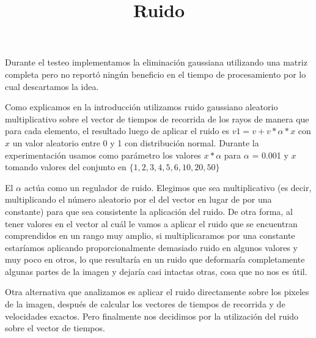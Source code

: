 \par Durante el testeo implementamos la eliminación gaussiana utilizando una matriz completa pero no reportó ningún beneficio en el tiempo de procesamiento por lo cual descartamos la idea.

\title{Ruido} Como explicamos en la introducción utilizamos ruido gaussiano aleatorio multiplicativo sobre el vector de tiempos de recorrida de los rayos de manera que para cada elemento, el resultado luego de aplicar el ruido es $v{1}= v + v * \alpha * x$ con $x$ un valor aleatorio entre 0 y 1 con distribución normal.
Durante la experimentación usamos como parámetro los valores
$x * \alpha$ para $\alpha$ = 0.001 y $x$ tomando valores del conjunto en $\{1,2,3,4,5,6,10,20,50\}$
\par El $\alpha$ actúa como un regulador de ruido. Elegimos que sea multiplicativo (es decir, multiplicando el número aleatorio por el del vector en lugar de por una constante) para que sea consistente la aplicación del ruido. De otra forma, al tener valores en el vector al cuál le vamos a aplicar el ruido que se encuentran comprendidos en un rango muy amplio, si multiplicaramos por una constante estaríamos aplicando proporcionalmente demasiado ruido en algunos valores y muy poco en otros, lo que resultaría en un ruido que deformaría completamente algunas partes de la imagen y dejaría casi intactas otras, cosa que no nos es útil.

\par Otra alternativa que analizamos es aplicar el ruido directamente sobre los pixeles de la imagen, después de calcular los vectores de tiempos de recorrida y de velocidades exactos. Pero finalmente nos decidimos por la utilización del ruido sobre el vector de tiempos. 




